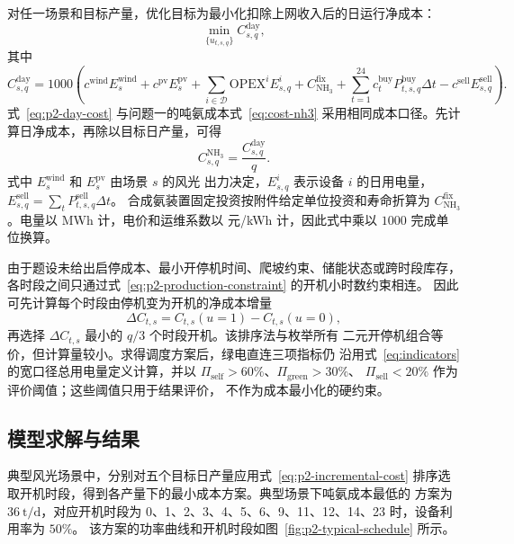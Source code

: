 对任一场景和目标产量，优化目标为最小化扣除上网收入后的日运行净成本：
\begin{equation}
  \min_{\{u_{t,s,q}\}} C_{s,q}^{\mathrm{day}},
  \label{eq:p2-objective}
\end{equation}
其中
\begin{equation}
  C_{s,q}^{\mathrm{day}}
  =1000\left(
      c^{\mathrm{wind}}E_s^{\mathrm{wind}}
      +c^{\mathrm{pv}}E_s^{\mathrm{pv}}
      +\sum_{i\in\mathcal{D}}\mathrm{OPEX}^{i}E_{s,q}^{i}
      +C_{\mathrm{NH_3}}^{\mathrm{fix}}
      +\sum_{t=1}^{24}c_t^{\mathrm{buy}}P_{t,s,q}^{\mathrm{buy}}\Delta t
      -c^{\mathrm{sell}}E_{s,q}^{\mathrm{sell}}
    \right).
  \label{eq:p2-day-cost}
\end{equation}
式~\eqref{eq:p2-day-cost} 与问题一的吨氨成本式~\eqref{eq:cost-nh3}
采用相同成本口径。先计算日净成本，再除以目标日产量，可得
\begin{equation}
  C_{s,q}^{\mathrm{NH_3}}=\frac{C_{s,q}^{\mathrm{day}}}{q}.
  \label{eq:p2-unit-cost}
\end{equation}
式中 $E_s^{\mathrm{wind}}$ 和 $E_s^{\mathrm{pv}}$ 由场景 $s$ 的风光
出力决定，$E_{s,q}^{i}$ 表示设备 $i$ 的日用电量，
$E_{s,q}^{\mathrm{sell}}=\sum_tP_{t,s,q}^{\mathrm{sell}}\Delta t$。
合成氨装置固定投资按附件给定单位投资和寿命折算为
$C_{\mathrm{NH_3}}^{\mathrm{fix}}$。电量以 MWh 计，电价和运维系数以
元/kWh 计，因此式中乘以 $1000$ 完成单位换算。

由于题设未给出启停成本、最小开停机时间、爬坡约束、储能状态或跨时段库存，
各时段之间只通过式~\eqref{eq:p2-production-constraint} 的开机小时数约束相连。
因此可先计算每个时段由停机变为开机的净成本增量
\begin{equation}
  \Delta C_{t,s}=C_{t,s}(u=1)-C_{t,s}(u=0),
  \label{eq:p2-incremental-cost}
\end{equation}
再选择 $\Delta C_{t,s}$ 最小的 $q/3$ 个时段开机。该排序法与枚举所有
二元开停机组合等价，但计算量较小。求得调度方案后，绿电直连三项指标仍
沿用式~\eqref{eq:indicators} 的宽口径总用电量定义计算，并以
$\Pi_{\mathrm{self}}>60\%$、$\Pi_{\mathrm{green}}>30\%$、
$\Pi_{\mathrm{sell}}<20\%$ 作为评价阈值；这些阈值只用于结果评价，
不作为成本最小化的硬约束。

\subsection{模型求解与结果}

典型风光场景中，分别对五个目标日产量应用式~\eqref{eq:p2-incremental-cost}
排序选取开机时段，得到各产量下的最小成本方案。典型场景下吨氨成本最低的
方案为 $36~\mathrm{t/d}$，对应开机时段为
0、1、2、3、4、5、6、9、11、12、14、23 时，设备利用率为 $50\%$。
该方案的功率曲线和开机时段如图~\ref{fig:p2-typical-schedule} 所示。

